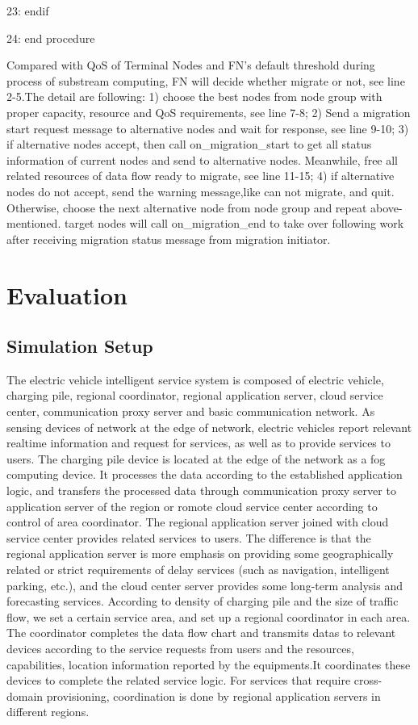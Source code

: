 \documentclass[conference]{IEEEtran}
\begin{document}
23:  endif

24: end procedure

Compared with QoS of Terminal Nodes and FN's default threshold during process of substream computing, FN will decide whether migrate or not, see line 2-5.The detail are following: 1) choose the best nodes from node group with proper capacity, resource and QoS requirements, see line 7-8; 2) Send a migration start request message to alternative nodes and wait for response, see line 9-10; 3) if alternative nodes accept, then call on\_migration\_start to get all status information of current nodes and send to alternative nodes. Meanwhile, free all related resources of data flow ready to migrate, see line 11-15; 4) if alternative nodes do not accept, send the warning message,like can not migrate, and quit. Otherwise, choose the next alternative node from node group and repeat above-mentioned. target nodes will call on\_migration\_end to take over following work after receiving migration status message from migration initiator.

\section{Evaluation}
\subsection{Simulation Setup}
The electric vehicle intelligent service system is composed of electric vehicle, charging pile, regional coordinator, regional application server, cloud service center, communication proxy server and basic communication network. As sensing devices of network at the edge of network, electric vehicles report relevant realtime information and request for services, as well as to provide services to users. The charging pile device is located at the edge of the network as a fog computing device. It processes the data according to the established application logic, and transfers the processed data through communication proxy server to application server of the region or romote cloud service center according to control of area coordinator. The regional application server joined with cloud service center provides related services to users. The difference is that the regional application server is more emphasis on providing some geographically related or strict requirements of delay services (such as navigation, intelligent parking, etc.), and the cloud center server provides some long-term analysis and forecasting services. According to density of charging pile and the size of traffic flow, we set a certain service area, and set up a regional coordinator in each area. The coordinator completes the data flow chart and transmits datas to relevant devices according to the service requests from users and the resources, capabilities, location information reported by the equipments.It coordinates these devices to complete the related service logic. For services that require cross-domain provisioning, coordination is done by regional application servers in different regions.
\end{document}
